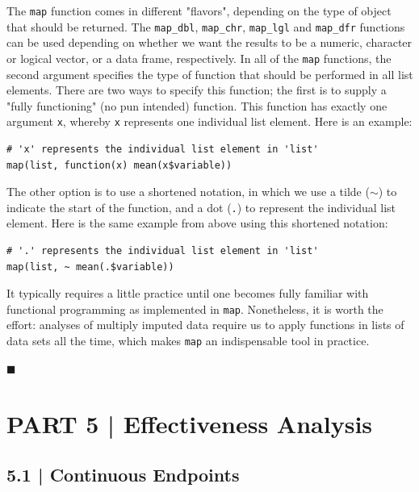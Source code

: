 The \texttt{map} function comes in different "flavors", depending on the type of object that should be returned. The \texttt{map\_dbl}, \texttt{map\_chr}, \texttt{map\_lgl} and \texttt{map\_dfr} functions can be used depending on whether we want the results to be a numeric, character or logical vector, or a data frame, respectively. In all of the \texttt{map} functions, the second argument specifies the type of function that should be performed in all list elements. There are two ways to specify this function; the first is to supply a "fully functioning" (no pun intended) function. This function has exactly one argument \texttt{x}, whereby \texttt{x} represents one individual list element. Here is an example:

\begin{lstlisting}
# 'x' represents the individual list element in 'list'
map(list, function(x) mean(x$variable))
\end{lstlisting}

The other option is to use a shortened notation, in which we use a tilde ($\sim$) to indicate the start of the function, and a dot (\texttt{.}) to represent the individual list element. Here is the same example from above using this shortened notation:

\begin{lstlisting}
# '.' represents the individual list element in 'list'
map(list, ~ mean(.$variable))
\end{lstlisting}

It typically requires a little practice until one becomes fully familiar with functional programming as implemented in \texttt{map}. Nonetheless, it is worth the effort: analyses of multiply imputed data require us to apply functions in lists of data sets all the time, which makes \texttt{map} an indispensable tool in practice.  

\begin{flushright}
    $\blacksquare$
\end{flushright}

\section{{\textsf{\textcolor{sBlue}{\small PART 5 |}}} Effectiveness Analysis}

\subsection{{\normalfont\textsf{\textcolor{sBlue}{\small 5.1 |}}} Continuous Endpoints}

